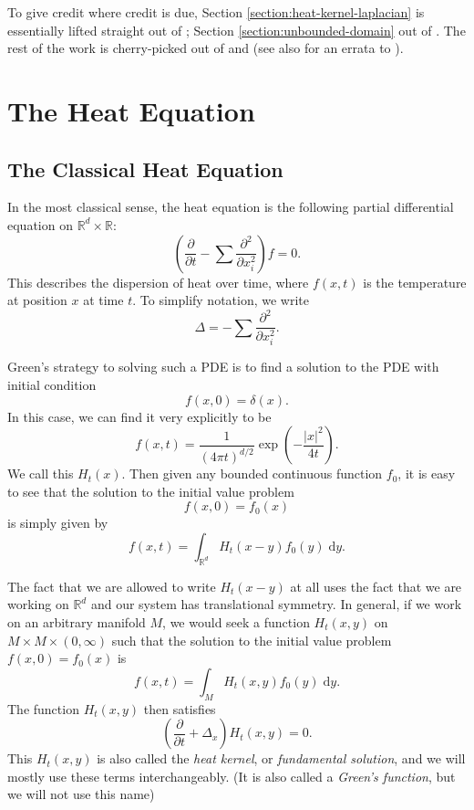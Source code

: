 \documentclass{shortart}
\theoremstyle{definition}
\newcommand\R{\mathbb{R}}
\renewcommand\d{\mathrm{d}}
\begin{document}
To give credit where credit is due, Section \ref{section:heat-kernel-laplacian} is essentially lifted straight out of \cite[Section 4]{patodi-curvature}; Section \ref{section:unbounded-domain} out of \cite{dodziuk-maximum}. The rest of the work is cherry-picked out of \cite{atiyah-bott-patodi} and \cite{atiyah-patodi-singer} (see also \cite{atiyah-bott-patodi-errata} for an errata to \cite{atiyah-bott-patodi}).

\section{The Heat Equation}\label{section:heat-equation}
\subsection{The Classical Heat Equation}
In the most classical sense, the heat equation is the following partial differential equation on $\R^d \times \R$:
\[
  \left(\frac{\partial}{\partial t} - \sum \frac{\partial^2}{\partial x_i^2}\right)f = 0.
\]
This describes the dispersion of heat over time, where $f(x, t)$ is the temperature at position $x$ at time $t$. To simplify notation, we write
\[
  \Delta = - \sum \frac{\partial^2}{\partial x_i^2}.
\]

Green's strategy to solving such a PDE is to find a solution to the PDE with initial condition
\[
  f(x, 0) = \delta (x).
\]
In this case, we can find it very explicitly to be
\[
  f(x, t) = \frac{1}{(4\pi t)^{d/2}} \exp \left(-\frac{|x|^2}{4t}\right).
\]
We call this $H_t(x)$. Then given any bounded continuous function $f_0$, it is easy to see that the solution to the initial value problem
\[
  f(x, 0) = f_0(x)
\]
is simply given by
\[
  f(x, t) = \int_{\R^d} H_t(x - y) f_0(y)\;\d y.
\]

The fact that we are allowed to write $H_t(x - y)$ at all uses the fact that we are working on $\R^d$ and our system has translational symmetry. In general, if we work on an arbitrary manifold $M$, we would seek a function $H_t(x, y)$ on $M \times M \times (0, \infty)$ such that the solution to the initial value problem $f(x, 0) = f_0(x)$ is
\[
  f(x, t) = \int_M H_t(x, y) f_0(y)\;\d y.
\]
The function $H_t(x, y)$ then satisfies
\[
  \left(\frac{\partial}{\partial t} + \Delta_x\right) H_t(x, y) = 0.
\]
This $H_t(x, y)$ is also called the \emph{heat kernel}, or \emph{fundamental solution}, and we will mostly use these terms interchangeably. (It is also called a \emph{Green's function}, but we will not use this name)
\end{document}
